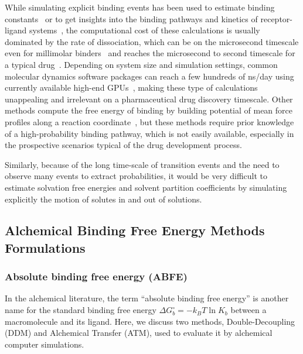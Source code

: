 \documentclass[9pt,bestpractices]{livecoms}
\begin{document}
While simulating explicit binding events has been used to estimate binding constants~\cite{jong2011determining,pan2017quantitative} or to get insights into the binding pathways and kinetics of receptor-ligand systems~\cite{teo2016adaptive,votapka2017seekr,doerr2014onthefly,plattner2015protein,dixon2018predicting}, the computational cost of these calculations is usually dominated by the rate of dissociation, which can be on the microsecond timescale even for millimolar binders~\cite{pan2017quantitative} and reaches the microsecond to second timescale for a typical drug~\cite{basavapathruni2012conformational,hyre2006cooperative}.
Depending on system size and simulation settings, common molecular dynamics software packages can reach a few hundreds of ns/day using currently available high-end GPUs~\cite{eastman2017openmm,kutzner2019more}, making these type of calculations unappealing and irrelevant on a pharmaceutical drug discovery timescale.
Other methods compute the free energy of binding by building potential of mean force profiles along a reaction coordinate~\cite{woo2005calculation,velez-vega2013overcoming,limongelli2013funnel,heinzelmann2017attachpullrelease}, but these methods require prior knowledge of a high-probability binding pathway, which is not easily available, especially in the prospective scenarios typical of the drug development process.

Similarly, because of the long time-scale of transition events and the need to observe many events to extract probabilities, it would be very difficult to estimate solvation free energies and solvent partition coefficients by simulating explicitly the motion of solutes in and out of solutions.

\subsection{Alchemical Binding Free Energy Methods Formulations}
\label{subsec:formulations-abfe-rbfe}

\subsubsection{Absolute binding free energy (ABFE)}

In the alchemical literature, the term ``absolute binding free energy'' is another name for the standard binding free energy $\Delta G^\circ_b = - k_B T \ln K_b$ between a macromolecule and its ligand.  Here, we discuss two methods, Double-Decoupling (DDM) and Alchemical Transfer (ATM), used to evaluate it by alchemical computer simulations.
\end{document}
